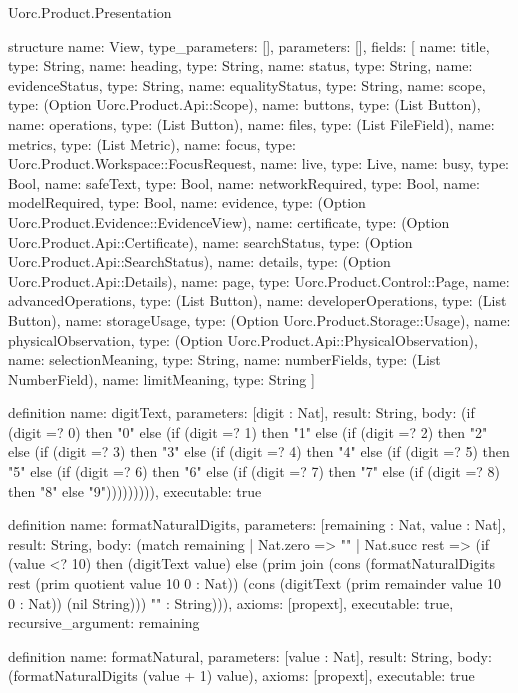 \begin{lexlean}{Uorc.Product.Presentation}
\begin{semanticmodule}
structure{
  name: View,
  type_parameters: [],
  parameters: [],
  fields: [
    {name: title, type: String},
    {name: heading, type: String},
    {name: status, type: String},
    {name: evidenceStatus, type: String},
    {name: equalityStatus, type: String},
    {name: scope, type: (Option Uorc.Product.Api::Scope)},
    {name: buttons, type: (List Button)},
    {name: operations, type: (List Button)},
    {name: files, type: (List FileField)},
    {name: metrics, type: (List Metric)},
    {name: focus, type: Uorc.Product.Workspace::FocusRequest},
    {name: live, type: Live},
    {name: busy, type: Bool},
    {name: safeText, type: Bool},
    {name: networkRequired, type: Bool},
    {name: modelRequired, type: Bool},
    {name: evidence, type: (Option Uorc.Product.Evidence::EvidenceView)},
    {name: certificate, type: (Option Uorc.Product.Api::Certificate)},
    {name: searchStatus, type: (Option Uorc.Product.Api::SearchStatus)},
    {name: details, type: (Option Uorc.Product.Api::Details)},
    {name: page, type: Uorc.Product.Control::Page},
    {name: advancedOperations, type: (List Button)},
    {name: developerOperations, type: (List Button)},
    {name: storageUsage, type: (Option Uorc.Product.Storage::Usage)},
    {name: physicalObservation, type: (Option Uorc.Product.Api::PhysicalObservation)},
    {name: selectionMeaning, type: String},
    {name: numberFields, type: (List NumberField)},
    {name: limitMeaning, type: String}
  ]
}

definition{
  name: digitText,
  parameters: [digit : Nat],
  result: String,
  body: (if (digit =? 0) then "0" else (if (digit =? 1) then "1" else (if (digit =? 2) then "2" else (if (digit =? 3) then "3" else (if (digit =? 4) then "4" else (if (digit =? 5) then "5" else (if (digit =? 6) then "6" else (if (digit =? 7) then "7" else (if (digit =? 8) then "8" else "9"))))))))),
  executable: true
}

definition{
  name: formatNaturalDigits,
  parameters: [remaining : Nat, value : Nat],
  result: String,
  body: (match remaining
    | Nat.zero => ""
    | Nat.succ rest => (if (value <? 10) then (digitText value) else (prim join (cons (formatNaturalDigits rest (prim quotient value 10 0 : Nat)) (cons (digitText (prim remainder value 10 0 : Nat)) (nil String))) "" : String))),
  axioms: [propext],
  executable: true,
  recursive_argument: remaining
}

definition{
  name: formatNatural,
  parameters: [value : Nat],
  result: String,
  body: (formatNaturalDigits (value + 1) value),
  axioms: [propext],
  executable: true
}


\end{semanticmodule}
\end{lexlean}
